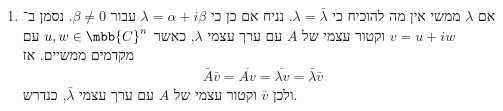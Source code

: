 \documentclass[a4paper,10pt,twoside,openany]{book}
\begin{document}
\begin{solution}
\begin{enumerate}
\item אם
$\lambda$
ממשי אין מה להוכיח כי
$\lambda = \bar{\lambda}$.
נניח אם כן כי
$\lambda = \alpha + i\beta$
עבור
$\beta \neq 0$.
נסמן ב־%
$v = u + iw$
וקטור עצמי של
$A$
עם ערך עצמי
$\lambda$,
כאשר
$u,w \in \mbb{C}^n$
עם מקדמים ממשיים.
אז
\begin{align*}
\bar{A}\bar{v} = \overline{Av} = \overline{\lambda v} = \bar{\lambda} \bar{v}
\end{align*}
ולכן
$\bar{v}$
וקטור עצמי של
$A$
עם ערך עצמי
$\bar{\lambda}$,
כנדרש.
\end{enumerate}
\end{solution}










\pagebreak

\printbibliography
\end{document}
